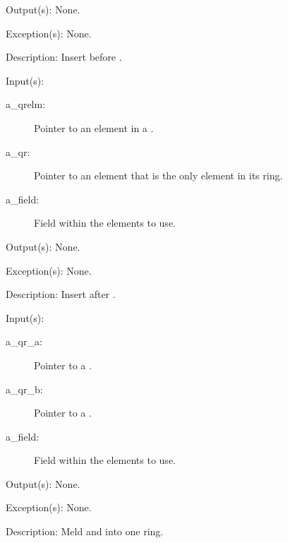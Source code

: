 \begin{capi}
\begin{capilist}
\begin{description}
		\end{description}
	\item[Output(s): ] None.
	\item[Exception(s): ] None.
	\item[Description: ]
		Insert  before .
	\end{capilist}
\label{qr_after_insert}
	\begin{capilist}
	\item[Input(s): ]
		\begin{description}\item[]
		\item[a\_qrelm: ]
			Pointer to an element in a .
		\item[a\_qr: ]
			Pointer to an element that is the only element in its
			ring.
		\item[a\_field: ]
			Field within the  elements to use.
		\end{description}
	\item[Output(s): ] None.
	\item[Exception(s): ] None.
	\item[Description: ]
		Insert  after .
	\end{capilist}
\label{qr_meld}
	\begin{capilist}
	\item[Input(s): ]
		\begin{description}\item[]
		\item[a\_qr\_a: ]
			Pointer to a \classname{qr}.
		\item[a\_qr\_b: ]
			Pointer to a \classname{qr}.
		\item[a\_field: ]
			Field within the  elements to use.
		\end{description}
	\item[Output(s): ] None.
	\item[Exception(s): ] None.
	\item[Description: ]
		Meld  and  into one ring.
	\end{capilist}
\label{qr_split}

\end{capi}

